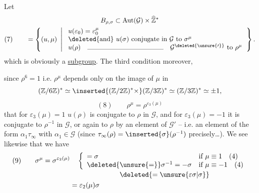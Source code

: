 Let
\[
\begin{gathered}
B_{\rho,\sigma}\subset\operatorname{Aut}(\mathcal{G})\times\widehat{\mathbb Z}^{*}
\\
(7)\qquad =\left\{(u,\mu)\ \left|\
\begin{array}{l}
u(\varepsilon_0)=\varepsilon_0^\mu\\
\deleted{\text{and}}\ u(\sigma)\ \text{conjugate in }\mathcal{G}\text{ to }\sigma^\mu\\
u(\rho)\quad\rule{4cm}{0.3pt}\quad
\mathcal{G}^{\deleted{\unsure{\prime}}}\text{ to }\rho^\mu
\end{array}\right.\right\}.
\end{gathered}
\]
which is obviously a \uline{subgroup}.
The third condition  moreover,


since $\rho^6=1$ i.e. $\rho^\mu$ depends only on the image
of $\mu$ in
\[
(\mathbb Z/6\mathbb Z)^*\simeq
\inserted{(\mathbb Z/2\mathbb Z)^*\times}
(\mathbb Z/3\mathbb Z)^*\simeq(\mathbb Z/3\mathbb Z)^*\simeq\pm1,
\]
\[
(8)\qquad \rho^\mu=\rho^{\varepsilon_3(\mu)}
\]
that for $\varepsilon_3(\mu)=1$
$u(\rho)$ is conjugate to $\rho$ in $\mathcal{G}$, and for
$\varepsilon_3(\mu)=-1$ it is conjugate to $\rho^{-1}$ in
$\mathcal{G}$, or again to $\rho$ by an element of
$\mathcal{G}'$ -- i.e. an element of the form $\alpha_1\tau_\infty$
with $\alpha_1\in\mathcal{G}$ (since
$\tau_\infty(\rho)=\inserted{\sigma}(\rho^{-1})$ precisely\ldots).
\deleted{\[
(9)\qquad u(\rho)=\zeta\rho,\qquad u(\sigma)=\eta\sigma
\quad(\zeta,\eta\in\mathcal{G})
\]}
\deleted{\[
(10)\qquad \zeta=\alpha\rho(\alpha)^{-1},
\qquad\eta=\beta
\]}
We see likewise that we have
\[
\begin{aligned}
(9)\qquad \sigma^\mu=\sigma^{\varepsilon_2(\mu)}
&\quad\left\{\begin{array}{ll}
=\sigma&\text{if }\mu\equiv1\quad(4)\\
\deleted{\unsure{=}}\sigma^{-1}=-\sigma
&\text{if }\mu\equiv-1\quad(4)
\end{array}\right.\\[-2pt]
&\hspace{2.5cm}\deleted{=\unsure{\varepsilon\sigma|\sigma}}\\
&=\varepsilon_2(\mu)\sigma
\end{aligned}
\]

